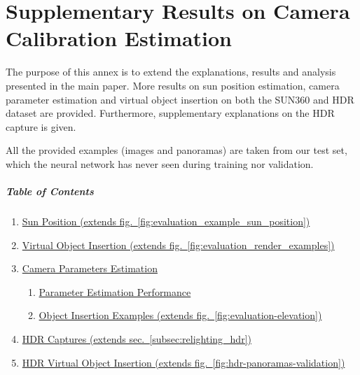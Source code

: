 \chapter{Supplementary Results on Camera Calibration Estimation}     %
\label{annex4}

\graphicspath{{annex4_figures/}}

The purpose of this annex is to extend the explanations, results and
analysis presented in the main paper. More results on sun position
estimation, camera parameter estimation and virtual object insertion on
both the SUN360 and HDR dataset are provided. Furthermore, supplementary
explanations on the HDR capture is given.

All the provided examples (images and panoramas) are taken from our test
set, which the neural network has never seen during training nor
validation.

\hypertarget{table-of-contents}{%
\paragraph{Table of Contents}\label{table-of-contents}}

\begin{enumerate}
\tightlist
\item
  \protect\hyperlink{sunpos}{Sun Position (extends fig.~\ref{fig:evaluation_example_sun_position})}
\item
  \protect\hyperlink{virtualobjectinsert}{Virtual Object Insertion
  (extends fig.~\ref{fig:evaluation_render_examples})}
\item
  \protect\hyperlink{camparameval}{Camera Parameters Estimation}

  \begin{enumerate}
  \tightlist
  \item
    \protect\hyperlink{camparamestimperf}{Parameter Estimation
    Performance}
  \item
    \protect\hyperlink{camparaminsertionex}{Object Insertion Examples
    (extends fig.~\ref{fig:evaluation-elevation})}
  \end{enumerate}
\item
  \protect\hyperlink{HDRcaptures}{HDR Captures (extends sec.~\ref{subsec:relighting_hdr})}
\item
  \protect\hyperlink{virtualobjectinsertHDR}{HDR Virtual Object
  Insertion (extends fig.~\ref{fig:hdr-panoramas-validation})}
\end{enumerate}

